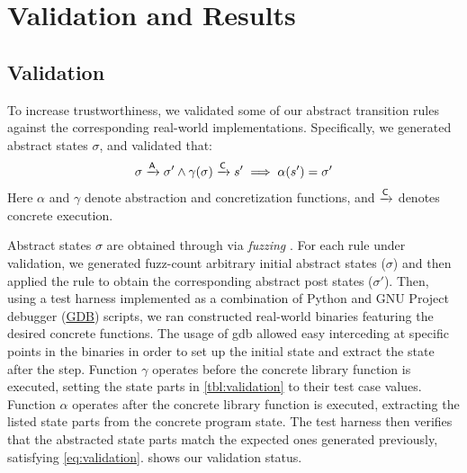 \chapter{Validation and Results}
\label{ch:eicfg-validation}

\section{Validation}\label{eicfg-validation}
To increase trustworthiness, we validated some of our abstract transition rules against the corresponding real-world implementations. Specifically, we generated abstract states $\sigma$, and validated that:
\begin{equation}
    \sigma\xrightarrow{\mathsf A}\sigma'\land\gamma(\sigma)\xrightarrow{\mathsf C} s'\implies\alpha(s')=\sigma' \label{eq:validation}
\end{equation}
Here $\alpha$ and $\gamma$ denote abstraction and concretization functions, and $\xrightarrow{\mathsf C}$ denotes concrete execution.

Abstract states $\sigma$ are obtained through via \emph{fuzzing} \autocite{quickcheck}.
For each rule under validation, we generated \gls{fuzz-count} arbitrary initial abstract states ($\sigma$) and then applied the rule to obtain the corresponding abstract post states ($\sigma'$).
Then, using a test harness implemented as a combination of Python and GNU Project debugger (\href{https://www.sourceware.org/gdb/}{GDB}) scripts, we ran constructed real-world binaries featuring the desired concrete functions.
The usage of \acs{gdb} allowed easy interceding at specific points in the binaries in order to set up the initial state and extract the state after the step.
Function $\gamma$ operates before the concrete library function is executed, setting the state parts in \cref{tbl:validation} to their test case values.
Function $\alpha$ operates after the concrete library function is executed, extracting the listed state parts from the concrete program state.
The test harness then verifies that the abstracted state parts match the expected ones generated previously, satisfying \cref{eq:validation}.
 shows our validation status.

